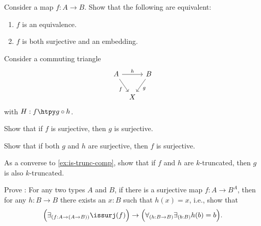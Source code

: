 \begin{exercises}
  \exitem \label{ex:is-equiv-is-emb-is-surjective}Consider a map $f:A\to B$. Show that the following are equivalent:
  \begin{enumerate}
  \item $f$ is an equivalence.
  \item $f$ is both surjective and an embedding.
  \end{enumerate}
  \exitem Consider a commuting triangle
  \begin{equation*}
    \begin{tikzcd}[column sep=tiny]
      A \arrow[rr,"h"] \arrow[dr,swap,"f"] & & B \arrow[dl,"g"] \\
      & X
    \end{tikzcd}
  \end{equation*}
  with $H:f\htpy g\circ h$.
  \begin{subexenum}
  \item Show that if $f$ is surjective, then $g$ is surjective.
  \item Show that if both $g$ and $h$ are surjective, then $f$ is surjective.
  \item As a converse to \cref{ex:is-trunc-comp}, show that if $f$ and $h$ are $k$-truncated, then $g$ is also $k$-truncated.
  \end{subexenum}
  \exitem Prove : For any two types $A$ and $B$, if there is a surjective map $f:A\to B^A$, then for any $h:B\to B$ there exists an $x:B$ such that $h(x)=x$, i.e., show that
  \begin{equation*}
    \Big(\exists_{(f:A\to(A\to B))}\issurj(f)\Big)\to\Big(\forall_{(h:B\to B)}\exists_{(b:B)}h(b)=b\Big).
  \end{equation*}
\end{exercises}
